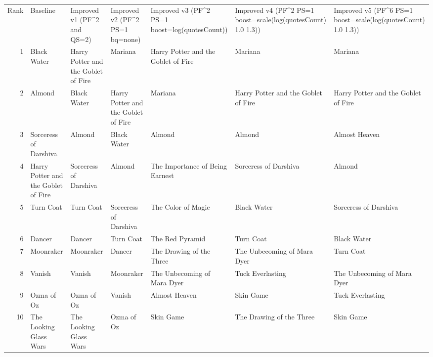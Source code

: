 \begin{tabular}{rllllll}
Rank & Baseline & Improved v1 (PF^2 and QS=2) & Improved v2 (PF^2 PS=1 bq=none) & Improved v3 (PF^2 PS=1 boost=log(quotesCount)) & Improved v4 (PF^2 PS=1 boost=scale(log(quotesCount) 1.0 1.3)) & Improved v5 (PF^6 PS=1 boost=scale(log(quotesCount) 1.0 1.3)) \\
1 & Black Water & Harry Potter and the Goblet of Fire & Mariana & Harry Potter and the Goblet of Fire & Mariana & Mariana \\
2 & Almond & Black Water & Harry Potter and the Goblet of Fire & Mariana & Harry Potter and the Goblet of Fire & Harry Potter and the Goblet of Fire \\
3 & Sorceress of Darshiva & Almond & Black Water & Almond & Almond & Almost Heaven \\
4 & Harry Potter and the Goblet of Fire & Sorceress of Darshiva & Almond & The Importance of Being Earnest & Sorceress of Darshiva & Almond \\
5 & Turn Coat & Turn Coat & Sorceress of Darshiva & The Color of Magic & Black Water & Sorceress of Darshiva \\
6 & Dancer & Dancer & Turn Coat & The Red Pyramid & Turn Coat & Black Water \\
7 & Moonraker & Moonraker & Dancer & The Drawing of the Three & The Unbecoming of Mara Dyer & Turn Coat \\
8 & Vanish & Vanish & Moonraker & The Unbecoming of Mara Dyer & Tuck Everlasting & The Unbecoming of Mara Dyer \\
9 & Ozma of Oz & Ozma of Oz & Vanish & Almost Heaven & Skin Game & Tuck Everlasting \\
10 & The Looking Glass Wars & The Looking Glass Wars & Ozma of Oz & Skin Game & The Drawing of the Three & Skin Game \\
\end{tabular}
